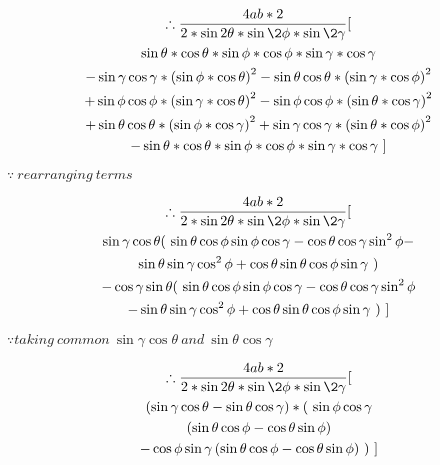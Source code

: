 \documentclass[journal,12pt,twocolumn]{IEEEtran}
\begin{document}
\vspace{0.3cm}
\begin{multline*}
        \therefore \frac{4ab*2}{2*\sin2\theta*\sin\2\phi*\sin\2\gamma}[ \\
        \sin\theta*\cos\theta*\sin\phi*\cos\phi*\sin\gamma*\cos\gamma \\-\sin\gamma\cos\gamma* \left( \sin\phi*\cos\theta \right)^2-
        \sin\theta\cos\theta* \left( \sin\gamma*\cos\phi \right)^2\\+\sin\phi\cos\phi* \left( \sin\gamma*\cos\theta \right)^2-\sin\phi\cos\phi* \left( \sin\theta*\cos\gamma \right)^2 \\+
        \sin\theta\cos\theta* \left( \sin\phi*\cos\gamma \right)^2+ \sin\gamma\cos\gamma* \left( \sin\theta*\cos\phi \right)^2\\ - \sin\theta*\cos\theta*\sin\phi*\cos\phi*\sin\gamma*\cos\gamma~
        ]
\end{multline*}
\begin{flushright}
$\because ~rearranging ~terms$
\end{flushright}
\vspace{0.3cm}
\begin{multline*}
    \therefore \frac{4ab*2}{2*\sin2\theta*\sin\2\phi*\sin\2\gamma}
    [\\ 
    \sin\gamma\cos\theta (~ \sin\theta\cos\phi\sin\phi\cos\gamma  -\cos\theta\cos\gamma\sin^2\phi -\\ \sin\theta\sin\gamma\cos^2\phi +
        \cos\theta\sin\theta\cos\phi\sin\gamma~ )
    \\-\cos\gamma\sin\theta ( ~\sin\theta\cos\phi\sin\phi\cos\gamma - \cos\theta\cos\gamma\sin^2\phi \\ - \sin\theta\sin\gamma\cos^2\phi+ \cos\theta\sin\theta\cos\phi\sin\gamma ~)~]
\end{multline*}
\begin{flushright}
$\because taking~ common ~\sin\gamma\cos\theta ~and~ \sin\theta\cos\gamma$
\end{flushright}

\vspace{0.3cm}
\begin{multline*}
        \therefore \frac{4ab*2}{2*\sin2\theta*\sin\2\phi*\sin\2\gamma}
        [\\  (\sin\gamma\cos\theta - \sin\theta\cos\gamma)* (~ \sin\phi\cos\gamma\\ \left( \sin\theta\cos\phi -\cos\theta\sin\phi  \right)\\ - \cos\phi\sin\gamma\left( \sin\theta\cos\phi -\cos\theta\sin\phi  \right)~ )~
        ]
\end{multline*}
\end{document}
